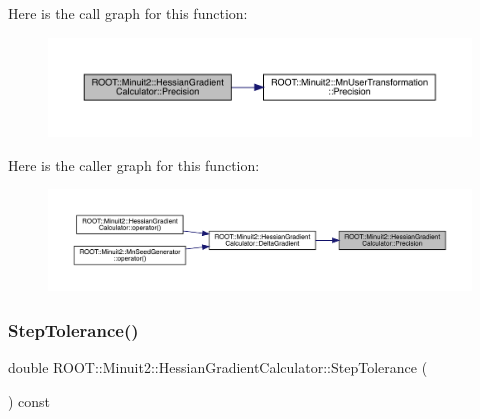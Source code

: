Here is the call graph for this function\+:\nopagebreak
\begin{figure}[H]
\begin{center}
\leavevmode
\includegraphics[width=350pt]{dc/d17/classROOT_1_1Minuit2_1_1HessianGradientCalculator_afeacc0589b4f4d6a1e6e6b985f24cc3b_cgraph}
\end{center}
\end{figure}
Here is the caller graph for this function\+:\nopagebreak
\begin{figure}[H]
\begin{center}
\leavevmode
\includegraphics[width=350pt]{dc/d17/classROOT_1_1Minuit2_1_1HessianGradientCalculator_afeacc0589b4f4d6a1e6e6b985f24cc3b_icgraph}
\end{center}
\end{figure}
\mbox{\label{classROOT_1_1Minuit2_1_1HessianGradientCalculator_ac66592218817d4cbc8a3be76938b435d}} 
\subsubsection{\texorpdfstring{StepTolerance()}{StepTolerance()}\hspace{0.1cm}{\footnotesize\ttfamily [1/2]}}
{\footnotesize\ttfamily double R\+O\+O\+T\+::\+Minuit2\+::\+Hessian\+Gradient\+Calculator\+::\+Step\+Tolerance (\begin{DoxyParamCaption}{ }\end{DoxyParamCaption}) const}

